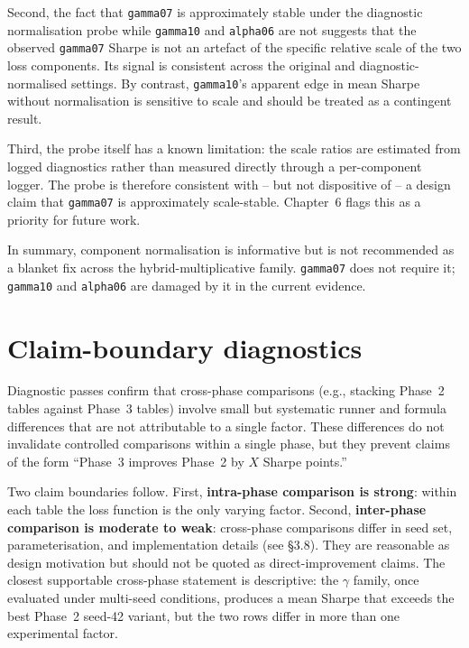 Second, the fact that \texttt{gamma07} is approximately stable under the diagnostic normalisation probe while \texttt{gamma10} and \texttt{alpha06} are not suggests that the observed \texttt{gamma07} Sharpe is not an artefact of the specific relative scale of the two loss components. Its signal is consistent across the original and diagnostic-normalised settings. By contrast, \texttt{gamma10}'s apparent edge in mean Sharpe without normalisation is sensitive to scale and should be treated as a contingent result.

Third, the probe itself has a known limitation: the scale ratios are estimated from logged diagnostics rather than measured directly through a per-component logger. The probe is therefore consistent with -- but not dispositive of -- a design claim that \texttt{gamma07} is approximately scale-stable. Chapter~6 flags this as a priority for future work.

In summary, component normalisation is informative but is not recommended as a blanket fix across the hybrid-multiplicative family. \texttt{gamma07} does not require it; \texttt{gamma10} and \texttt{alpha06} are damaged by it in the current evidence.

\section{Claim-boundary diagnostics}

\label{sec:claim-boundary-diagnostics}

Diagnostic passes confirm that cross-phase comparisons (e.g., stacking Phase~2 tables against Phase~3 tables) involve small but systematic runner and formula differences that are not attributable to a single factor. These differences do not invalidate controlled comparisons within a single phase, but they prevent claims of the form ``Phase~3 improves Phase~2 by $X$ Sharpe points.''

Two claim boundaries follow. First, \textbf{intra-phase comparison is strong}: within each table the loss function is the only varying factor. Second, \textbf{inter-phase comparison is moderate to weak}: cross-phase comparisons differ in seed set, parameterisation, and implementation details (see \S3.8). They are reasonable as design motivation but should not be quoted as direct-improvement claims. The closest supportable cross-phase statement is descriptive: the $\gamma$ family, once evaluated under multi-seed conditions, produces a mean Sharpe that exceeds the best Phase~2 seed-42 variant, but the two rows differ in more than one experimental factor.


